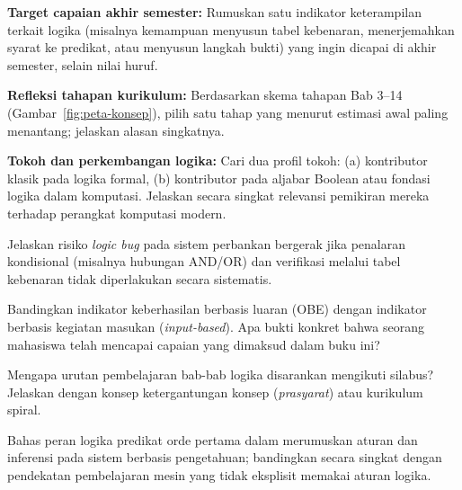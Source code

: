 \documentclass[../main]{subfiles}
\begin{document}






\begin{aktivitas}
  \item \textbf{Target capaian akhir semester:} Rumuskan satu indikator keterampilan terkait logika (misalnya kemampuan menyusun tabel kebenaran, menerjemahkan syarat ke predikat, atau menyusun langkah bukti) yang ingin dicapai di akhir semester, selain nilai huruf.
  \item \textbf{Refleksi tahapan kurikulum:} Berdasarkan skema tahapan Bab 3--14 (Gambar~\ref{fig:peta-konsep}), pilih satu tahap yang menurut estimasi awal paling menantang; jelaskan alasan singkatnya.
  \item \textbf{Tokoh dan perkembangan logika:} Cari dua profil tokoh: (a) kontributor klasik pada logika formal, (b) kontributor pada aljabar Boolean atau fondasi logika dalam komputasi. Jelaskan secara singkat relevansi pemikiran mereka terhadap perangkat komputasi modern.
\end{aktivitas}

\begin{latihan}
  \item Jelaskan risiko \textit{logic bug} pada sistem perbankan bergerak jika penalaran kondisional (misalnya hubungan AND/OR) dan verifikasi melalui tabel kebenaran tidak diperlakukan secara sistematis.
  \item Bandingkan indikator keberhasilan berbasis luaran (OBE) dengan indikator berbasis kegiatan masukan (\textit{input-based}). Apa bukti konkret bahwa seorang mahasiswa telah mencapai capaian yang dimaksud dalam buku ini?
  \item Mengapa urutan pembelajaran bab-bab logika disarankan mengikuti silabus? Jelaskan dengan konsep ketergantungan konsep (\textit{prasyarat}) atau kurikulum spiral.
  \item Bahas peran logika predikat orde pertama dalam merumuskan aturan dan inferensi pada sistem berbasis pengetahuan; bandingkan secara singkat dengan pendekatan pembelajaran mesin yang tidak eksplisit memakai aturan logika.
\end{latihan}
\end{document}
